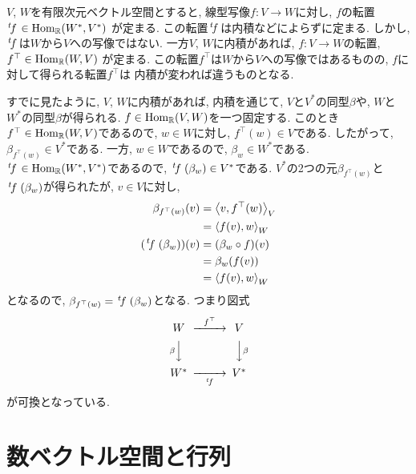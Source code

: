 \begin{remark}
  $V$, $W$を有限次元ベクトル空間とすると,
  線型写像$f\colon V\to W$に対し,
  $f$の転置
  $\left.^{t}\!f\right.\in\operatorname{Hom}_{\mathbb{R}}(W^\ast,V^\ast)$
  が定まる.
  この転置$\left.^{t}\!f\right.$は内積などによらずに定まる.
  しかし, $\left.^{t}\!f\right.$は$W$から$V$への写像ではない.
  一方$V$, $W$に内積があれば,
  $f\colon V\to W$の転置,
  $f^\top\in\operatorname{Hom}_{\mathbb{R}}(W,V)$
  が定まる.
  この転置$f^\top$は$W$から$V$への写像ではあるものの,
  $f$に対して得られる転置$f^\top$は
  内積が変われば違うものとなる.

  すでに見たように,
  $V$, $W$に内積があれば,
  内積を通じて,
  $V$と$V^\ast$の同型$\beta$や,
  $W$と$W^\ast$の同型$\beta$が得られる.
  $f\in \operatorname{Hom}_{\mathbb{R}}(V,W)$を一つ固定する.
  このとき$f^\top \in \operatorname{Hom}_{\mathbb{R}}(W,V)$であるので,
  $w\in W$に対し, $f^\top(w)\in V$である.
  したがって, $\beta_{f^\top(w)}\in V^\ast$である.
  一方, $w\in W$であるので, $\beta_w\in W^\ast$である.
  $\left.^{t}\!f\right.\in \operatorname{Hom}_{\mathbb{R}}(W^\ast,V^\ast)$であるので,
  $\left.^{t}\!f\right.(\beta_w)\in V^\ast$である.
  $V^\ast$の2つの元$\beta_{f^\top(w)}$と$\left.^{t}\!f\right.(\beta_w)$が得られたが,
  $v\in V$に対し,
  \begin{align*}
    \beta_{f^\top(w)}(v)
    &=\Braket{v,f^\top(w)}_V\\
    &=\Braket{f(v),w}_W\\
    (\left.^{t}\!f\right.(\beta_w))(v)
    &=(\beta_w\circ f)(v)\\
    &=\beta_w(f(v))\\
    &=\Braket{f(v),w}_W
  \end{align*}
  となるので,
  $\beta_{f^\top(w)}=\left.^{t}\!f\right.(\beta_w)$となる.
  つまり図式
  \begin{align*}
    \begin{CD}
      W @>f^\top>> V\\
      @V\beta VV @VV\beta V\\
      W^\ast @>>\transposed{f}> V^\ast
    \end{CD}
  \end{align*}
  が可換となっている.
\end{remark}


\section{数ベクトル空間と行列}
